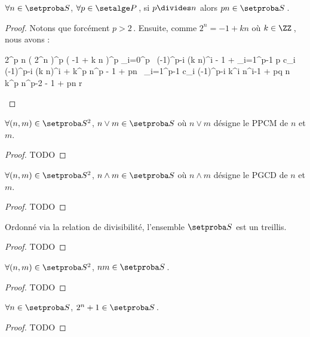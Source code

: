 \begin{fact}
	$\forall n \in \ourset$, $\forall p \in \primeset$\,,
	si $p \divides n$ alors $p n \in \ourset$\,.
\end{fact}

\begin{proof}
	Notons que forcément $p > 2$\,.
	Ensuite, comme $2^n = -1 + k n$ où $k \in \ZZ$\,,
	nous avons :
    
    \medskip
    
    \begin{stepcalc}[style=sar]
    	2^{p n}
    \explnext{}
    	\big( 2^n \big)^p
    \explnext{}
    	\big( -1 + k n \big)^p
    \explnext{}
    	\dsum_{i=0}^p  \, (-1)^{p-i} \cdot (k n)^i
    	- 1 + \dsum_{i=1}^{p-1} p c_i \cdot (-1)^{p-i} \cdot (k n)^i + k^p \cdot n^p
    	- 1 + pn \, \dsum_{i=1}^{p-1} c_i \cdot (-1)^{p-i} \cdot k^i n^{i-1} + pq \cdot n \cdot k^p \cdot n^{p-2}
    \explnext{}
    	- 1 + pn \cdot r
    \end{stepcalc}
\end{proof}




\begin{fact}
	$\forall (n , m) \in \ourset^2$, $n \vee m \in \ourset$ où $n \vee m$ désigne le PPCM de $n$ et $m$.
\end{fact}

\begin{proof}
	TODO
\end{proof}




\begin{fact}
	$\forall (n , m) \in \ourset^2$, $n \wedge m \in \ourset$ où $n \wedge m$ désigne le PGCD de $n$ et $m$.
\end{fact}

\begin{proof}
	TODO
\end{proof}




\begin{fact}
	Ordonné via la relation de divisibilité, l'ensemble $\ourset$ est un treillis.
\end{fact}

\begin{proof}
	TODO
\end{proof}




\begin{fact}
	$\forall (n , m) \in \ourset^2$, $n m \in \ourset$\,.
\end{fact}

\begin{proof}
	TODO
\end{proof}




\begin{fact}
	$\forall n \in \ourset$, $2^n + 1 \in \ourset$\,.
\end{fact}

\begin{proof}
	TODO
\end{proof}

